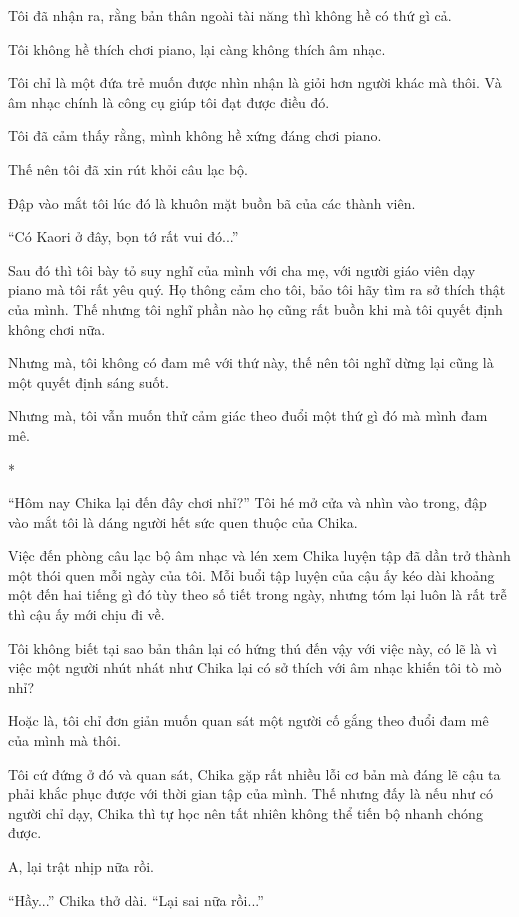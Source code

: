 {Tôi đã nhận ra, rằng bản thân ngoài tài năng thì không hề có thứ gì cả.

Tôi không hề thích chơi piano, lại càng không thích âm nhạc.

Tôi chỉ là một đứa trẻ muốn được nhìn nhận là giỏi hơn người khác mà
thôi. Và âm nhạc chính là công cụ giúp tôi đạt được điều đó.

Tôi đã cảm thấy rằng, mình không hề xứng đáng chơi piano.

Thế nên tôi đã xin rút khỏi câu lạc bộ.

Đập vào mắt tôi lúc đó là khuôn mặt buồn bã của các thành viên.

``Có Kaori ở đây, bọn tớ rất vui đó...''

Sau đó thì tôi bày tỏ suy nghĩ của mình với cha mẹ, với người giáo viên
dạy piano mà tôi rất yêu quý. Họ thông cảm cho tôi, bảo tôi hãy tìm ra
sở thích thật của mình. Thế nhưng tôi nghĩ phần nào họ cũng rất buồn khi
mà tôi quyết định không chơi nữa.

Nhưng mà, tôi không có đam mê với thứ này, thế nên tôi nghĩ dừng lại
cũng là một quyết định sáng suốt.

Nhưng mà, tôi vẫn muốn thử cảm giác theo đuổi một thứ gì đó mà mình đam
mê.

*

``Hôm nay Chika lại đến đây chơi nhỉ?'' Tôi hé mở cửa và nhìn vào trong,
đập vào mắt tôi là dáng người hết sức quen thuộc của Chika.

Việc đến phòng câu lạc bộ âm nhạc và lén xem Chika luyện tập đã dần trở
thành một thói quen mỗi ngày của tôi. Mỗi buổi tập luyện của cậu ấy kéo
dài khoảng một đến hai tiếng gì đó tùy theo số tiết trong ngày, nhưng
tóm lại luôn là rất trễ thì cậu ấy mới chịu đi về.

Tôi không biết tại sao bản thân lại có hứng thú đến vậy với việc này, có
lẽ là vì việc một người nhút nhát như Chika lại có sở thích với âm nhạc
khiến tôi tò mò nhỉ?

Hoặc là, tôi chỉ đơn giản muốn quan sát một người cố gắng theo đuổi đam
mê của mình mà thôi.

Tôi cứ đứng ở đó và quan sát, Chika gặp rất nhiều lỗi cơ bản mà đáng lẽ
cậu ta phải khắc phục được với thời gian tập của mình. Thế nhưng đấy là
nếu như có người chỉ dạy, Chika thì tự học nên tất nhiên không thể tiến
bộ nhanh chóng được.

A, lại trật nhịp nữa rồi.

``Hầy...'' Chika thở dài. ``Lại sai nữa rồi...''

}
